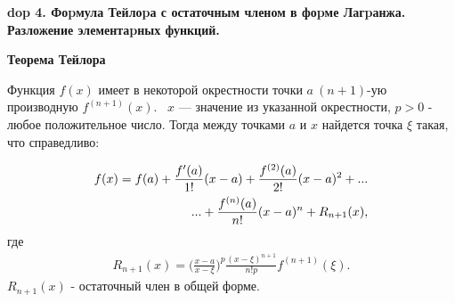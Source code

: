 \textbf{\LARGE dop 4. Фоpмула Тейлоpа с остаточным членом в фоpме Лагpанжа. Разложение элементаpных функций.}

\textbf{Теорема Тейлора}

\mathLet Функция $f(x)$ имеет в некоторой окрестности  точки $a \ (n+1)$-ую производную $f^{(n+1)}(x)$. \mathLet \ $x$ --- значение из указанной окрестности, $p > 0$ - любое положительное число. Тогда между точками $a$ и $x$ найдется точка $\xi$ такая, что справедливо:

\begin{align}\label{Taylor}
    f(x) = f(a) + \frac{f'(a)}{1!}(x-a) + \frac{f^{(2)}(a)}{2!}(x-a)^2 + ... \notag\\
    ... + \frac{f^{(n)}(a)}{n!}(x-a)^n + R_{n+1}(x),
\end{align}
где
\begin{align}\label{R_n+1_condition}
    R_{n+1}(x) = \bigg(\frac{x-a}{x-\xi}\bigg)^p\frac{(x-\xi)^{n+1}}{n!p}f^{(n+1)}(\xi).
\end{align}
$R_{n+1}(x)$ - остаточный член в общей форме.

